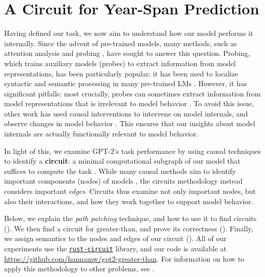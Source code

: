 \documentclass{article}
\begin{document}
    \section{A Circuit for Year-Span Prediction}\label{sec:circuit}
    Having defined our task, we now aim to understand how our model performs it internally. Since the advent of pre-trained models, many methods, such as attention analysis \citep{clark-etal-2019-bert} and probing \citep{belinkov-2022-probing}, have sought to answer this question. Probing, which trains auxiliary models (probes) to extract information from model representations, has been particularly popular; it has been used to localize syntactic and semantic processing in many pre-trained LMs \citep{peters-etal-2018-deep,tenney-etal-2019-bert,fayyaz-etal-2021-models}. However, it has significant pitfalls: most crucially, probes can sometimes extract information from model representations that is irrelevant to model behavior \citep{elazar-etal-2021-amnesic,ravichander-etal-2021-probing,hanna-etal-2023-functional}. To avoid this issue, other work has used causal interventions \citep{pearl2009} to intervene on model internals, and observe changes in model behavior \citep{giulianelli-etal-2018-hood,vig2020causal,geiger2021causal}. This ensures that our insights about model internals are actually functionally relevant to model behavior.

    In light of this, we examine GPT-2's task performance by using causal techniques to identify a \textbf{circuit}: a minimal computational subgraph of our model that suffices to compute the task \citep{olah2020zoom, elhage2021mathematical}. While many causal methods aim to identify important components (nodes) of models \citep{vig2020causal,de-cao-etal-2020-decisions,geiger2021causal}, the circuits methodology instead considers important \emph{edges}. Circuits thus examine not only important nodes, but also their interactions, and how they work together to support model behavior.
    
    Below, we explain the \textit{path patching} technique, and how to use it to find circuits (). We then find a circuit for greater-than, and prove its correctness (). Finally, we assign semantics to the nodes and edges of our circuit (). All of our experiments use the \href{https://github.com/redwoodresearch/rust_circuit_public}{\texttt{rust-circuit}} library, and our code is available at \url{https://github.com/hannamw/gpt2-greater-than}. For information on how to apply this methodology to other problems, see .
\end{document}
